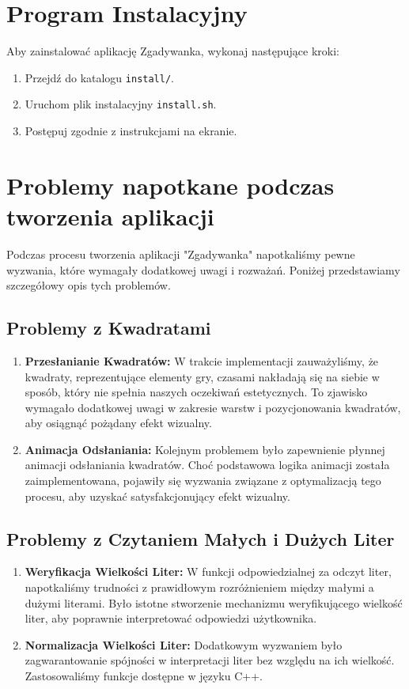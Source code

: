 \documentclass{article}
\begin{document}
	
	\section{Program Instalacyjny}
	
	Aby zainstalować aplikację Zgadywanka, wykonaj następujące kroki:
	\begin{enumerate}
		\item Przejdź do katalogu \texttt{install/}.
		\item Uruchom plik instalacyjny \texttt{install.sh}.
		\item Postępuj zgodnie z instrukcjami na ekranie.
	\end{enumerate}
	\section{Problemy napotkane podczas tworzenia aplikacji}


Podczas procesu tworzenia aplikacji "Zgadywanka" napotkaliśmy pewne wyzwania, które wymagały dodatkowej uwagi i rozważań. Poniżej przedstawiamy szczegółowy opis tych problemów.

\subsection{Problemy z Kwadratami}

\begin{enumerate}
	\item \textbf{Przesłanianie Kwadratów:} W trakcie implementacji zauważyliśmy, że kwadraty, reprezentujące elementy gry, czasami nakładają się na siebie w sposób, który nie spełnia naszych oczekiwań estetycznych. To zjawisko wymagało dodatkowej uwagi w zakresie warstw i pozycjonowania kwadratów, aby osiągnąć pożądany efekt wizualny.
	
	\item \textbf{Animacja Odsłaniania:} Kolejnym problemem było zapewnienie płynnej animacji odsłaniania kwadratów. Choć podstawowa logika animacji została zaimplementowana, pojawiły się wyzwania związane z optymalizacją tego procesu, aby uzyskać satysfakcjonujący efekt wizualny.
\end{enumerate}

\subsection{Problemy z Czytaniem Małych i Dużych Liter}

\begin{enumerate}
	\item \textbf{Weryfikacja Wielkości Liter:} W funkcji odpowiedzialnej za odczyt liter, napotkaliśmy trudności z prawidłowym rozróżnieniem między małymi a dużymi literami. Było istotne stworzenie mechanizmu weryfikującego wielkość liter, aby poprawnie interpretować odpowiedzi użytkownika.
	
	\item \textbf{Normalizacja Wielkości Liter:} Dodatkowym wyzwaniem było zagwarantowanie spójności w interpretacji liter bez względu na ich wielkość. Zastosowaliśmy funkcje dostępne w języku C++.
\end{enumerate}
\end{document}
